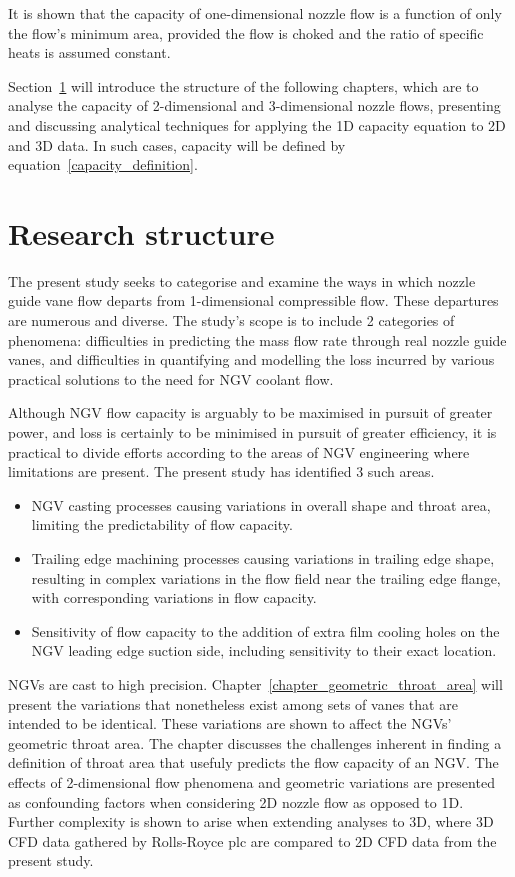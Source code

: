 \documentclass[a4paper, 11pt, oneside]{report}
\begin{document}
It is shown that the capacity of one-dimensional nozzle flow is a function of only the flow's minimum area, provided the flow is choked and the ratio of specific heats is assumed constant. 

Section~\ref{research_structure} will introduce the structure of the following chapters, which are to analyse the capacity of 2-dimensional and 3-dimensional nozzle flows, presenting and discussing analytical techniques for applying the 1D capacity equation to 2D and 3D data. In such cases, capacity will be defined by equation~\ref{capacity_definition}.

\section{Research structure}
\label{research_structure}

The present study seeks to categorise and examine the ways in which nozzle guide vane flow departs from 1-dimensional compressible flow. These departures are numerous and diverse. The study's scope is to include 2 categories of phenomena: difficulties in predicting the mass flow rate through real nozzle guide vanes, and difficulties in quantifying and modelling the loss incurred by various practical solutions to the need for NGV coolant flow.

Although NGV flow capacity is arguably to be maximised in pursuit of greater power, and loss is certainly to be minimised in pursuit of greater efficiency, it is practical to divide efforts according to the areas of NGV engineering where limitations are present. The present study has identified 3 such areas.
\begin{itemize}
	\item NGV casting processes causing variations in overall shape and throat area, limiting the predictability of flow capacity.
	\item Trailing edge machining processes causing variations in trailing edge shape, resulting in complex variations in the flow field near the trailing edge flange, with corresponding variations in flow capacity.
	\item Sensitivity of flow capacity to the addition of extra film cooling holes on the NGV leading edge suction side, including sensitivity to their exact location.
\end{itemize}

NGVs are cast to high precision. Chapter~\ref{chapter_geometric_throat_area} will present the variations that nonetheless exist among sets of vanes that are intended to be identical. These variations are shown to affect the NGVs' geometric throat area. The chapter discusses the challenges inherent in finding a definition of throat area that usefuly predicts the flow capacity of an NGV. The effects of 2-dimensional flow phenomena and geometric variations are presented as confounding factors when considering 2D nozzle flow as opposed to 1D. Further complexity is shown to arise when extending analyses to 3D, where 3D CFD data gathered by Rolls-Royce plc are compared to 2D CFD data from the present study.
\end{document}
